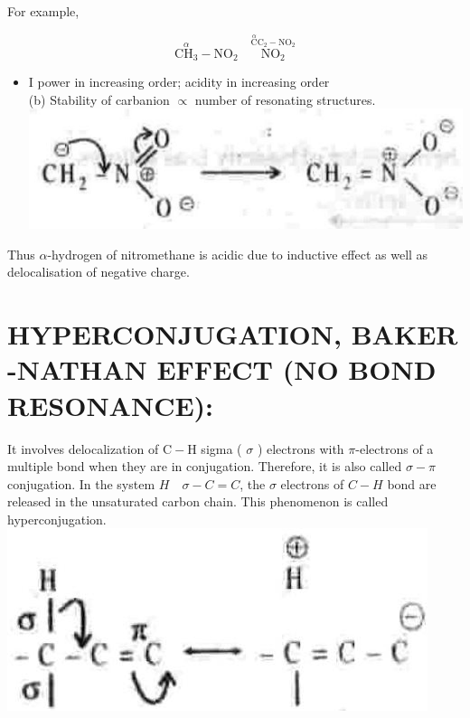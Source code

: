 \documentclass[10pt]{article}
\begin{document}
For example,

$$
\stackrel{\alpha}{\mathrm{CH}_{3}}-\mathrm{NO}_{2} \quad \stackrel{\stackrel{\alpha}{\mathrm{C}} \mathrm{C}_{2}-\mathrm{NO}_{2}}{\mathrm{NO}_{2}}
$$

\begin{itemize}
  \item I power in increasing order; acidity in increasing order\\
(b) Stability of carbanion $\propto$ number of resonating structures.\\
\includegraphics[max width=\textwidth, center]{2025_01_28_8470952b98110cec3aabg-080(2)}
\end{itemize}

Thus $\alpha$-hydrogen of nitromethane is acidic due to inductive effect as well as delocalisation of negative charge.

\section*{HYPERCONJUGATION, BAKER -NATHAN EFFECT (NO BOND RESONANCE):}
It involves delocalization of $\mathrm{C}-\mathrm{H}$ sigma ( $\sigma$ ) electrons with $\pi$-electrons of a multiple bond when they are in conjugation. Therefore, it is also called $\sigma-\pi$ conjugation. In the system $H \quad \sigma-C=C$, the $\sigma$ electrons of $C-H$ bond are released in the unsaturated carbon chain. This phenomenon is called hyperconjugation.\\
\includegraphics[max width=\textwidth, center]{2025_01_28_8470952b98110cec3aabg-081}
\end{document}
